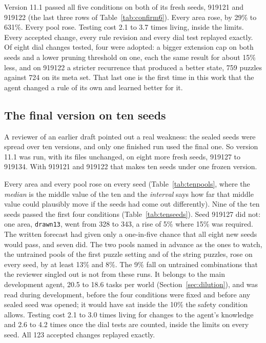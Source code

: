 \documentclass[11pt]{article}
\begin{document}
Version 11.1 passed all five conditions on both of its fresh seeds, 919121 and 919122 (the last three rows of Table~\ref{tab:confirm6}). Every area rose, by 29\% to 631\%. Every pool rose. Testing cost 2.1 to 3.7 times living, inside the limits. Every accepted change, every rule revision and every dial test replayed exactly. Of eight dial changes tested, four were adopted: a bigger extension cap on both seeds and a lower pruning threshold on one, each the same result for about 15\% less, and on 919122 a stricter recurrence that produced a better state, 759 puzzles against 724 on its meta set. That last one is the first time in this work that the agent changed a rule of its own and learned better for it.

\subsection{The final version on ten seeds}
\label{sec:ten}

A reviewer of an earlier draft pointed out a real weakness: the sealed seeds were spread over ten versions, and only one finished run used the final one. So version 11.1 was run, with its files unchanged, on eight more fresh seeds, 919127 to 919134. With 919121 and 919122 that makes ten seeds under one frozen version.

Every area and every pool rose on every seed (Table~\ref{tab:tenpools}, where the \emph{median} is the middle value of the ten and the \emph{interval} says how far that middle value could plausibly move if the seeds had come out differently). Nine of the ten seeds passed the first four conditions (Table~\ref{tab:tenseeds}). Seed 919127 did not: one area, \texttt{drawn13}, went from 328 to 343, a rise of 5\% where 15\% was required. The written forecast had given only a one-in-five chance that all eight new seeds would pass, and seven did. The two pools named in advance as the ones to watch, the untrained pools of the first puzzle setting and of the string puzzles, rose on every seed, by at least 13\% and 8\%. The 9\% fall on untrained combinations that the reviewer singled out is not from these runs. It belongs to the main development agent, 20.5 to 18.6 tasks per world (Section~\ref{sec:dilution}), and was read during development, before the four conditions were fixed and before any sealed seed was opened; it would have sat inside the 10\% the safety condition allows. Testing cost 2.1 to 3.0 times living for changes to the agent's knowledge and 2.6 to 4.2 times once the dial tests are counted, inside the limits on every seed. All 123 accepted changes replayed exactly.
\end{document}
